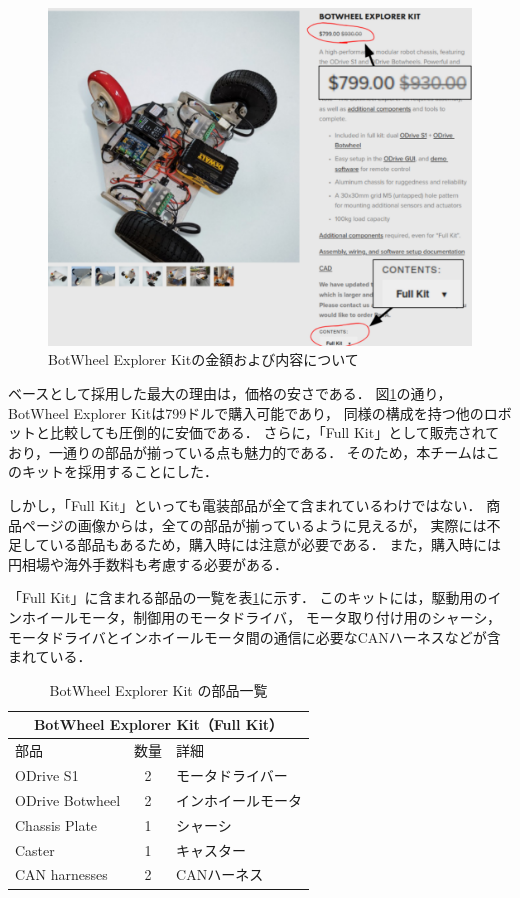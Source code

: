 \documentclass[twocolumn,9pt]{jsproceedings}
\begin{document}
\begin{figure}[h]
  \begin{center}
    \includegraphics[width=0.8\linewidth]{figs/b_kit_price.pdf}
    \caption{BotWheel Explorer Kitの金額および内容について}
    \label{fig:b_robot_price}
  \end{center}
\end{figure}

ベースとして採用した最大の理由は，価格の安さである．
図\ref{fig:b_robot_price}の通り，BotWheel Explorer Kitは799ドルで購入可能であり，
同様の構成を持つ他のロボットと比較しても圧倒的に安価である．
さらに，「Full Kit」として販売されており，一通りの部品が揃っている点も魅力的である．
そのため，本チームはこのキットを採用することにした．

しかし，「Full Kit」といっても電装部品が全て含まれているわけではない．
商品ページの画像からは，全ての部品が揃っているように見えるが，
実際には不足している部品もあるため，購入時には注意が必要である．
また，購入時には円相場や海外手数料も考慮する必要がある．

「Full Kit」に含まれる部品の一覧を表\ref{tab:botwheel_kit}に示す．
このキットには，駆動用のインホイールモータ，制御用のモータドライバ，
モータ取り付け用のシャーシ，モータドライバとインホイールモータ間の通信に必要なCANハーネスなどが含まれている．
\begin{table}[h]
  \centering
  \caption{BotWheel Explorer Kit の部品一覧}
  \begin{tabular}{|l|c|l|}
      \hline
      \multicolumn{3}{|c|}{\textbf{BotWheel Explorer Kit（Full Kit）}} \\
      \hline
      部品 & 数量 & 詳細 \\
      \hline
      ODrive S1 & 2 & モータドライバー \\
      ODrive Botwheel & 2 & インホイールモータ \\
      Chassis Plate & 1 & シャーシ \\
      Caster & 1 & キャスター \\
      CAN harnesses & 2 & CANハーネス \\
      \hline
  \end{tabular}
  \label{tab:botwheel_kit}
\end{table}
\end{document}
